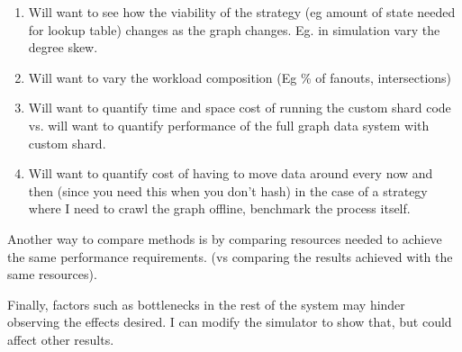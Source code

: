 \documentclass[draft]{article}
\begin{document}
\begin{enumerate}
\item Will want to see how the viability of the strategy (eg amount of state needed for lookup table) changes as the graph changes. Eg. in simulation vary the degree skew.
\item Will want to vary the workload composition (Eg \% of fanouts, intersections)
\item Will want to quantify time and space cost of running the custom shard code vs. will want to quantify performance of the full graph data system  with custom shard.
\item Will want to quantify cost of having to move data around every now and then (since you need this when you don't hash)
in the case of a strategy where I need to crawl the graph offline, benchmark the process itself.
\end{enumerate}

Another way to compare methods is by comparing resources needed to achieve the same  performance requirements. (vs comparing the results achieved with the same resources).

Finally, factors such as bottlenecks in the rest of the system may hinder observing the effects desired. I can modify the simulator to show that, but could affect other results.
\end{document}
